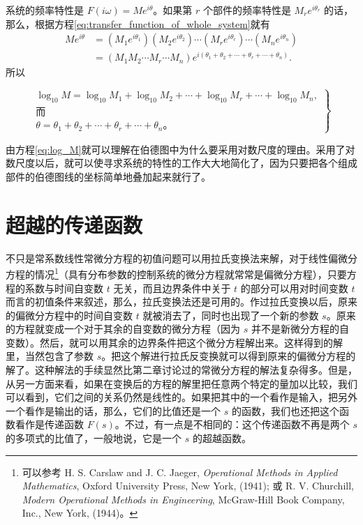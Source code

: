 系统的频率特性是 $F(i\omega)=Me^{i\theta}$。如果第 $r$ 个部件的频率特性是 $M_r e^{i\theta_r}$ 的话，那么，根据方程\eqref{eq:transfer_function_of_whole_system}就有
\begin{align*}
M e^{i\theta} &= (M_1 e^{i\theta_1}) (M_2 e^{i\theta_2})\cdots (M_r e^{i\theta_r})\cdots (M_n e^{i\theta_n})\\
& = (M_1 M_2 \cdots M_r \cdots M_n)e^{i(\theta_1 + \theta_2 + \cdots + \theta_r + \cdots + \theta_n)}.
\end{align*}
所以

\begin{equation}\label{eq:log_M}
\left.
\begin{array}{l}
\log_{10} M = \log_{10} M_1 + \log_{10} M_2 + \cdots + \log_{10} M_r + \cdots + \log_{10} M_n,\\
\mbox{而}\\
\theta = \theta_1 + \theta_2 + \cdots + \theta_r + \cdots + \theta_n。
\end{array}
\right\}
\end{equation}

由方程\eqref{eq:log_M}就可以理解在伯德图中为什么要采用对数尺度的理由。采用了对数尺度以后，就可以使寻求系统的特性的工作大大地简化了，因为只要把各个组成部件的伯德图线的坐标简单地叠加起来就行了。

\section{超越的传递函数}\label{ch3_section_7_transfer_function}

不只是常系数线性常微分方程的初值问题可以用拉氏变换法来解，对于线性偏微分方程的情况\footnote{可以参考 H. S. Carslaw and J. C. Jaeger, \textit{Operational Methods in Applied Mathematics}, Oxford University Press, New York, (1941); 或 R. V. Churchill, \textit{Modern Operational Methods in Engineering}, McGraw-Hill Book Company, Inc., New York, (1944)。}（具有分布参数的控制系统的微分方程就常常是偏微分方程），只要方程的系数与时间自变数 $t$ 无关，而且边界条件中关于 $t$ 的部分可以用对时间变数 $t$ 而言的初值条件来叙述，那么，拉氏变换法还是可用的。作过拉氏变换以后，原来的偏微分方程中的时间自变数 $t$ 就被消去了，同时也出现了一个新的参数 $s$。原来的方程就变成一个对于其余的自变数的微分方程（因为 $s$ 并不是新微分方程的自变数）。然后，就可以用其余的边界条件把这个微分方程解出来。这样得到的解里，当然包含了参数 $s$。把这个解进行拉氏反变换就可以得到原来的偏微分方程的解了。这种解法的手续显然比第二章讨论过的常微分方程的解法复杂得多。但是，从另一方面来看，如果在变换后的方程的解里把任意两个特定的量加以比较，我们可以看到，它们之间的关系仍然是线性的。如果把其中的一个看作是输入，把另外一个看作是输出的话，那么，它们的比值还是一个 $s$ 的函数，我们也还把这个函数看作是传递函数 $F(s)$。不过，有一点是不相同的：这个传递函数不再是两个 $s$ 的多项式的比值了，一般地说，它是一个 $s$ 的超越函数。

